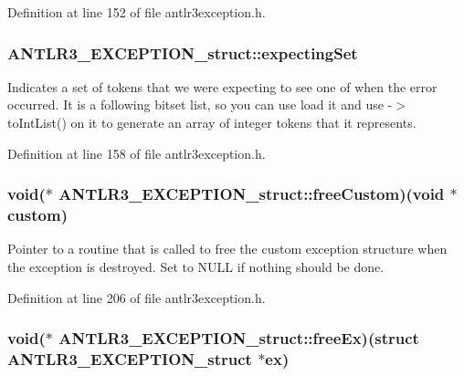 Definition at line 152 of file antlr3exception.\-h.

\hypertarget{struct_a_n_t_l_r3___e_x_c_e_p_t_i_o_n__struct_a49d95b1f53a40224a5791020a7be4761}{
\subsubsection[{expecting\-Set}]{ A\-N\-T\-L\-R3\-\_\-\-E\-X\-C\-E\-P\-T\-I\-O\-N\-\_\-struct\-::expecting\-Set}}\label{struct_a_n_t_l_r3___e_x_c_e_p_t_i_o_n__struct_a49d95b1f53a40224a5791020a7be4761}
Indicates a set of tokens that we were expecting to see one of when the error occurred. It is a following bitset list, so you can use load it and use -\/$>$to\-Int\-List() on it to generate an array of integer tokens that it represents. 

Definition at line 158 of file antlr3exception.\-h.

\hypertarget{struct_a_n_t_l_r3___e_x_c_e_p_t_i_o_n__struct_a94a8cffe5a17abac24efc432732ccfc4}{
\subsubsection[{free\-Custom}]{\setlength{\rightskip}{0pt plus 5cm}void($\ast$ A\-N\-T\-L\-R3\-\_\-\-E\-X\-C\-E\-P\-T\-I\-O\-N\-\_\-struct\-::free\-Custom)(void $\ast${\bf custom})}}\label{struct_a_n_t_l_r3___e_x_c_e_p_t_i_o_n__struct_a94a8cffe5a17abac24efc432732ccfc4}
Pointer to a routine that is called to free the custom exception structure when the exception is destroyed. Set to N\-U\-L\-L if nothing should be done. 

Definition at line 206 of file antlr3exception.\-h.

\hypertarget{struct_a_n_t_l_r3___e_x_c_e_p_t_i_o_n__struct_a75c2b86b3a43c5973f82e7e0a19ac4b4}{
\subsubsection[{free\-Ex}]{\setlength{\rightskip}{0pt plus 5cm}void($\ast$ A\-N\-T\-L\-R3\-\_\-\-E\-X\-C\-E\-P\-T\-I\-O\-N\-\_\-struct\-::free\-Ex)(struct {\bf A\-N\-T\-L\-R3\-\_\-\-E\-X\-C\-E\-P\-T\-I\-O\-N\-\_\-struct} $\ast$ex)}}\label{struct_a_n_t_l_r3___e_x_c_e_p_t_i_o_n__struct_a75c2b86b3a43c5973f82e7e0a19ac4b4}


